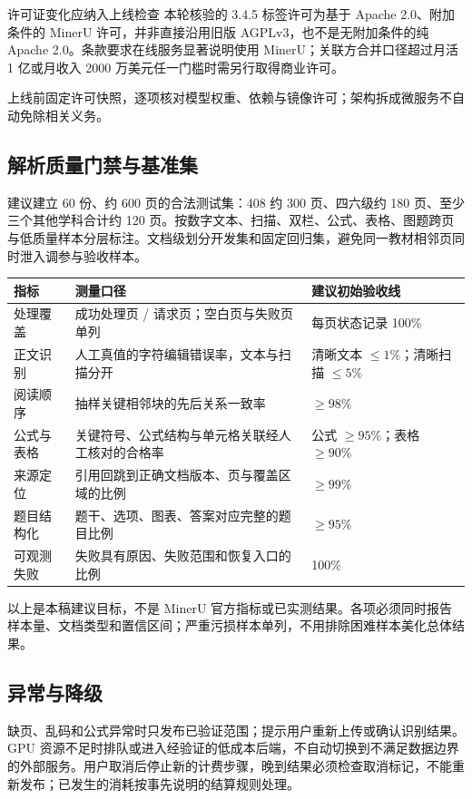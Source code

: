 \documentclass[UTF8,a4paper,11pt,fontset=none]{ctexart}
\newcommand{\cth}[1]{\textbf{\sffamily #1}}
\newcommand{\minor}[1]{{\small\color{Muted}#1}}
\newcommand{\cont}[1]{\clearpage\noindent{\small\sffamily\color{Muted}#1}\par\vspace{3pt}}
\newenvironment{tbl}{\par\vspace{3pt}\small\noindent\ignorespaces}{\unskip\par\vspace{5pt}}
\begin{document}
\begin{caution}{许可证变化应纳入上线检查}
本轮核验的 3.4.5 标签许可为基于 Apache 2.0、附加条件的 MinerU 许可，并非直接沿用旧版 AGPLv3，也不是无附加条件的纯 Apache 2.0。条款要求在线服务显著说明使用 MinerU；关联方合并口径超过月活 1 亿或月收入 2000 万美元任一门槛时需另行取得商业许可。\cite{mineru_license} \par
上线前固定许可快照，逐项核对模型权重、依赖与镜像许可；架构拆成微服务不自动免除相关义务。
\end{caution}

\cont{8 / PDF 解析与内容识别（续）}
\subsection{解析质量门禁与基准集}
建议建立 60 份、约 600 页的合法测试集：408 约 300 页、四六级约 180 页、至少三个其他学科合计约 120 页。按数字文本、扫描、双栏、公式、表格、图题跨页与低质量样本分层标注。文档级划分开发集和固定回归集，避免同一教材相邻页同时泄入调参与验收样本。

\begin{tbl}
\begin{tabularx}{\linewidth}{@{}L{30mm}YL{30mm}@{}}
\toprule
\cth{指标}&\cth{测量口径}&\cth{建议初始验收线}\\\midrule
处理覆盖&成功处理页 / 请求页；空白页与失败页单列&每页状态记录 100\%\\
正文识别&人工真值的字符编辑错误率，文本与扫描分开&清晰文本 $\leq1\%$；清晰扫描 $\leq5\%$\\
阅读顺序&抽样关键相邻块的先后关系一致率&$\geq98\%$\\
公式与表格&关键符号、公式结构与单元格关联经人工核对的合格率&公式 $\geq95\%$；表格 $\geq90\%$\\
来源定位&引用回跳到正确文档版本、页与覆盖区域的比例&$\geq99\%$\\
题目结构化&题干、选项、图表、答案对应完整的题目比例&$\geq95\%$\\
可观测失败&失败具有原因、失败范围和恢复入口的比例&100\%\\
\bottomrule
\end{tabularx}
\end{tbl}
\minor{以上是本稿建议目标，不是 MinerU 官方指标或已实测结果。各项必须同时报告样本量、文档类型和置信区间；严重污损样本单列，不用排除困难样本美化总体结果。}

\subsection{异常与降级}
缺页、乱码和公式异常时只发布已验证范围；提示用户重新上传或确认识别结果。GPU 资源不足时排队或进入经验证的低成本后端，不自动切换到不满足数据边界的外部服务。用户取消后停止新的计费步骤，晚到结果必须检查取消标记，不能重新发布；已发生的消耗按事先说明的结算规则处理。
\end{document}
